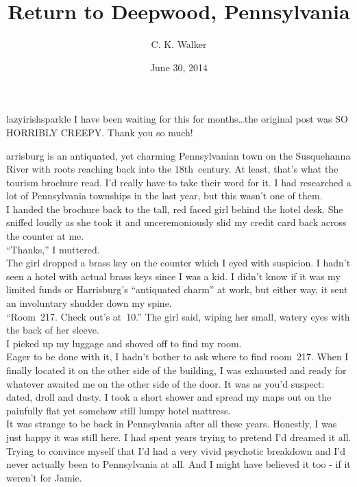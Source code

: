 \documentclass[a5paper]{scrartcl}
\title{Return to Deepwood, Pennsylvania}
\author{C. K. Walker}
\date{June 30, 2014}
\begin{document}
\maketitle

\begin{shadequote}[l]{lazyirishsparkle}
I have been waiting for this for months\dots the original post was SO HORRIBLY CREEPY. Thank you so much!
\end{shadequote}
\clearpage

arrisburg is an antiquated, yet charming Pennsylvanian town on the Susquehanna River with roots reaching back into the 18th~century. At least, that's what the tourism brochure read. I'd really have to take their word for it.  I had researched a lot of Pennsylvania townships in the last year, but this wasn't one of them.\\


I handed the brochure back to the tall, red faced girl behind the hotel desk. She sniffed loudly as she took it and unceremoniously slid my credit card back across the counter at me.\\


\enquote{Thanks,} I muttered.\\


The girl dropped a brass key on the counter which I eyed with suspicion. I hadn't seen a hotel with actual brass keys since I was a kid. I didn't know if it was my limited funds or Harrisburg's \enquote{antiquated charm} at work, but either way, it sent an involuntary shudder down my spine.\\


\enquote{Room~217. Check out's at~10.} The girl said, wiping her small, watery eyes with the back of her sleeve.\\


I picked up my luggage and shoved off to find my room. \\


Eager to be done with it, I hadn't bother to ask where to find room~217. When I finally located it on the other side of the building, I was exhausted and ready for whatever awaited me on the other side of the door. It was as you'd suspect: dated, droll and dusty. I took a short shower and spread my maps out on the painfully flat yet somehow still lumpy hotel mattress.\\


It was strange to be back in Pennsylvania after all these years. Honestly, I was just happy it was still here. I had spent years trying to pretend I'd dreamed it all. Trying to convince myself that I'd had a very vivid psychotic breakdown and I'd never actually been to Pennsylvania at all. And I might have believed it too - if it weren't for Jamie.\\
\end{document}
